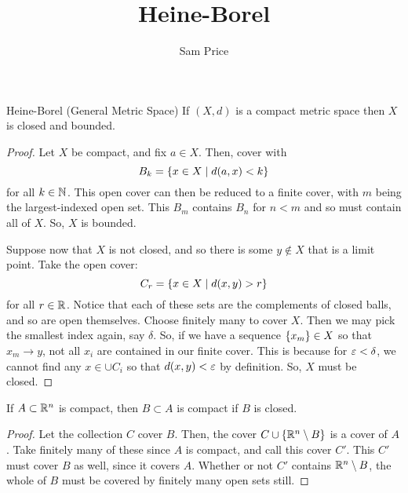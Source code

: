 \documentclass[11pt]{article}
\author{Sam Price}
\title{Heine-Borel}
\begin{document}
\maketitle

\begin{theorem}{Heine-Borel (General Metric Space)}{}
  If $(X, d)$ is a compact metric space then $X$ is closed and bounded.
\end{theorem}

\begin{proof}
  Let $X$ be compact, and fix $a \in X$. Then, cover with
  \[ B_{k} = \set{ x \in X \mid d(a, x) < k } \]
  for all $k \in \NN$.
  This open cover can then be reduced to a finite cover, with $m$ being the largest-indexed open set.
  This $B_{m}$ contains $B_{n}$ for $n < m$ and so must contain all of $X$. So, $X$ is bounded.

  Suppose now that $X$ is not closed, and so there is some $y \notin X$ that is a limit point.
  Take the open cover:
  \[ C_{r} = \set{ x \in X \mid d(x, y) > r } \]
  for all $r \in \RR$. Notice that each of these sets are the complements of closed balls, and so are open themselves.
  Choose finitely many to cover $X$. Then we may pick the smallest index again, say $\delta$.
  So, if we have a sequence $\set{x_{m}} \in X$ so that $x_{m} \to y$, not all $x_{i}$ are contained in our finite cover.
  This is because for $\eps < \delta$, we cannot find any $x \in \cup C_{i}$ so that $d(x, y) < \eps$ by definition.
  So, $X$ must be closed.
\end{proof}

\begin{lemma}{}{}
  If $A \subset \RR[n]$ is compact, then $B \subset A$ is compact if $B$ is closed.
\end{lemma}
\begin{proof}
  Let the collection $C$ cover $B$. Then, the cover $C \cup \set{ \RR[n] \setminus B }$ is a cover of $A$.
  Take finitely many of these since $A$ is compact, and call this cover $C'$. This $C'$ must cover $B$ as well, since it covers $A$.
  Whether or not $C'$ contains $\RR[n] \setminus B$, the whole of $B$ must be covered by finitely many open sets still.
\end{proof}
\end{document}
